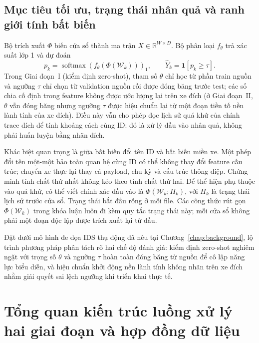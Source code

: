 \documentclass[12pt, a4paper, reqno, oneside]{book}
\begin{document}
\subsection{Mục tiêu tối ưu, trạng thái nhân quả và ranh giới tính bất biến}
Bộ trích xuất $\Phi$ biến cửa sổ thành ma trận $X\in\mathbb{R}^{W\times D}$. Bộ phân loại $f_\theta$ trả xác suất lớp 1 và dự đoán
\begin{equation}
p_k=\operatorname{softmax}(f_\theta(\Phi(\mathcal{W}_k)))_1,
\qquad \widehat Y_k=\mathbf{1}[p_k\geq\tau].
\end{equation}
Trong Giai đoạn~I (kiểm định zero-shot), tham số $\theta$ chỉ học từ phần train nguồn và ngưỡng $\tau$ chỉ chọn từ validation nguồn rồi được đóng băng trước test; các số chia cố định trong feature không được ước lượng lại trên xe đích (ở Giai đoạn~II, $\theta$ vẫn đóng băng nhưng ngưỡng $\tau$ được hiệu chuẩn lại từ một đoạn tiền tố nền lành tính của xe đích). Điều này vẫn cho phép đọc lịch sử quá khứ của chính trace đích để tính khoảng cách cùng ID: đó là xử lý đầu vào nhân quả, không phải huấn luyện bằng nhãn đích.

Khác biệt quan trọng là giữa bất biến đổi tên ID và bất biến miền xe. Một phép đổi tên một-một bảo toàn quan hệ cùng ID có thể không thay đổi feature cấu trúc; chuyển xe thực lại thay cả payload, chu kỳ và cấu trúc thông điệp. Chứng minh tính chất thứ nhất không kéo theo tính chất thứ hai.
Để thể hiện phụ thuộc vào quá khứ, có thể viết chính xác đầu vào là $\Phi(\mathcal W_k;H_k)$, với $H_k$ là trạng thái lịch sử trước cửa sổ. Trạng thái bắt đầu rỗng ở mỗi file. Các công thức rút gọn $\Phi(\mathcal W_k)$ trong khóa luận luôn đi kèm quy tắc trạng thái này; mỗi cửa sổ không phải một đoạn độc lập được trích xuất lại từ đầu.

Đặt dưới mô hình đe dọa IDS thụ động đã nêu tại Chương~\ref{chap:background}, lộ trình phương pháp phân tách rõ hai chế độ đánh giá: kiểm định zero-shot nghiêm ngặt với trọng số $\theta$ và ngưỡng $\tau$ hoàn toàn đóng băng từ nguồn để cô lập năng lực biểu diễn, và hiệu chuẩn khởi động nền lành tính không nhãn trên xe đích nhằm giải quyết sai lệch ngưỡng khi triển khai thực tế.

\section{Tổng quan kiến trúc luồng xử lý hai giai đoạn và hợp đồng dữ liệu}
\end{document}
